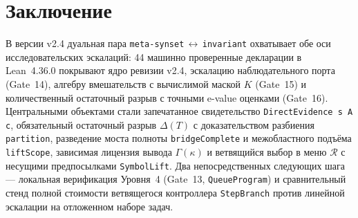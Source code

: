 \documentclass[11pt,a4paper]{article}
\theoremstyle{preprintthm}
\theoremstyle{preprintdef}
\newcommand{\calR}{\mathcal{R}}
\begin{document}
\section{Заключение}

В версии v2.4 дуальная пара \texttt{meta-synset}\,$\leftrightarrow$\,\texttt{invariant} охватывает обе оси исследовательских эскалаций: 44 машинно проверенные декларации в Lean~4.36.0 покрывают ядро ревизии v2.4, эскалацию наблюдательного порта (Gate~14), алгебру вмешательств с вычислимой маской $K$ (Gate~15) и количественный остаточный разрыв с точными e-value оценками (Gate~16). Центральными объектами стали запечатанное свидетельство \texttt{DirectEvidence s A c}, обязательный остаточный разрыв $\Delta(T)$ с доказательством разбиения \texttt{partition}, разведение моста полноты \texttt{bridgeComplete} и межобластного подъёма \texttt{liftScope}, зависимая лицензия вывода $\Gamma(\kappa)$ и ветвящийся выбор в меню $\calR$ с несущими предпосылками \texttt{SymbolLift}. Два непосредственных следующих шага --- локальная верификация Уровня~4 (Gate~13, \texttt{QueueProgram}) и сравнительный стенд полной стоимости ветвящегося контроллера \texttt{StepBranch} против линейной эскалации на отложенном наборе задач.
\end{document}
